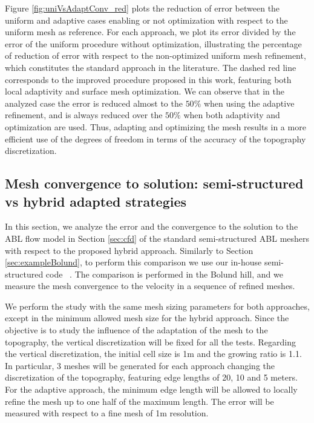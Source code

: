 \documentclass[1p]{elsarticle}
\begin{document}
Figure \ref{fig:uniVsAdaptConv_red} plots the reduction of error between the uniform and adaptive cases enabling or not optimization with respect to the uniform mesh as reference.
For each approach, we plot its error divided by the error of the uniform procedure without optimization, illustrating the percentage of reduction of error with respect to the  non-optimized uniform mesh refinement, which constitutes the standard approach in the literature.
The dashed red line corresponds to the improved procedure proposed in this work,  featuring both local adaptivity and surface mesh optimization.
We can observe that in the analyzed case the error  is reduced almost to the $50\%$ when using the adaptive refinement, and is always reduced over the $50\%$ when both adaptivity and optimization are used. 
Thus,  adapting  and optimizing the mesh results in a more efficient use of the degrees of freedom in terms of the accuracy of the topography discretization.

\subsection{Mesh convergence to solution: semi-structured vs hybrid adapted strategies}
\label{sec:convergenceSolution}




In this section, we analyze the error and the convergence to the solution to the ABL flow model in Section \ref{sec:cfd} of the standard semi-structured ABL meshers with respect to the proposed hybrid approach.
Similarly to Section \ref{sec:exampleBolund}, to perform this comparison we use our in-house semi-structured code \xWindMesh\ \cite{gargallo:meshForABLandWindFarms,gargallo2018JCP:WindFarms}.
The comparison is performed in the Bolund hill, and we measure the mesh convergence to the velocity in a sequence of refined meshes. 

We perform the study with the same  mesh sizing parameters for both approaches, except in the minimum allowed mesh size for the hybrid approach.
Since the objective is to study the influence of the adaptation of the mesh to the topography, the vertical discretization will be fixed for all the tests. 
Regarding the vertical discretization, the initial cell size is 1m and the growing ratio is 1.1.
In particular, 3 meshes will be generated for each approach changing the discretization of the topography,  featuring edge lengths of 20, 10 and 5 meters.
For the adaptive approach, the minimum edge length will be allowed to locally refine the mesh up to one half of the maximum length. 
The error will be measured with respect to a fine mesh of 1m resolution.
\end{document}
